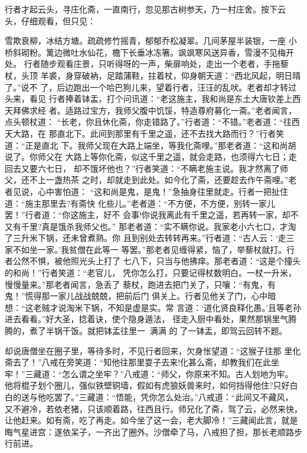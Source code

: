 行者才起云头，寻庄化斋，一直南行，忽见那古树参天，乃一村庄舍。按下云
头，仔细观看，但只见：

雪欺衰柳，冰结方塘。疏疏修竹摇青，郁郁乔松凝翠。几间茅屋半装银，一座
小桥斜砌粉。篱边微吐水仙花，檐下长垂冰冻箸。飒飒寒风送异香，雪漫不见梅开
处。
行者随步观看庄景，只听得呀的一声，柴扉响处，走出一个老者，手拖藜杖，头顶
羊裘，身穿破衲，足踏蒲鞋，拄着杖，仰身朝天道：“西北风起，明日晴了。”说不
了，后边跑出一个哈巴狗儿来，望着行者，汪汪的乱吠。老者却才转过头来，看见
行者捧着钵盂，打个问讯道：“老这施主，我和尚是东土大唐钦差上西天拜佛求经
者。适路过宝方，我师父腹中饥馁，特造尊府募化一斋。”老者闻言，点头顿杖道：
“长老，你且休化斋，你走错路了。”行者道：“不错。”老者道：“往西天大路，在
那直北下。此间到那里有千里之遥，还不去找大路而行？”行者笑道：“正是直北
下。我师父现在大路上端坐，等我化斋哩。”那老者道：“这和尚胡说了。你师父在
大路上等你化斋，似这千里之遥，就会走路，也须得六七日；走回去又要六七日，
却不饿坏他也？”行者笑道：“不瞒老施主说。我才然离了师父，还不上一盏热茶
之时，却就走到此处。如今化了斋，还要趁去作午斋哩。”老者见说，心中害怕道：
“这和尚是鬼，是鬼！”急抽身往里就走。行者一把扯住道：“施主那里去?有斋快
化些儿。”老者道：“不方便，不方便，别转一家儿罢！”行者道：“你这施主，好不
会事!你说我离此有千里之遥，若再转一家，却不又有千里?真是饿杀我师父也。”
那老者道：“实不瞒你说。我家老小六七口，才淘了三升米下锅，还未曾煮熟。你
且到别处去转转再来。”行者道：“古人云：‘走三家不如坐一家。’我贫僧在此等一
等罢。”那老者见缠得紧，恼了，举藜杖就打。行者公然不惧，被他照光头上打了
七八下，只当与他拂痒。那老者道：“这是个撞头的和尚！”行者笑道：“老官儿，
凭你怎么打，只要记得杖数明白。一杖一升米，慢慢量来。”那老者闻言，急丢了
藜杖，跑进去把门关了，只嚷：“有鬼，有鬼！”慌得那一家儿战战兢兢，把前后门
俱关上。行者见他关了门，心中暗想：“这老贼才说淘米下锅，不知是虚是实。常
言道：‘道化贤良释化愚。’且等老孙进去看看。”好大圣，捻着诀，使个隐身遁法，
径走入厨中看处，果然那锅里气腾腾的，煮了半锅干饭。就把钵盂往里一，满满
的了一钵盂，即驾云回转不题。

却说唐僧坐在圈子里，等待多时，不见行者回来，欠身怅望道：“这猴子往那
里化斋去了！”八戒在旁笑道：“知他往那里耍子去来!化甚么斋，却教我们在此坐
牢！”三藏道：“怎么谓之坐牢？”八戒道：“师父，你原来不知。古人划地为牢。
他将棍子划个圈儿，强似铁壁铜墙，假如有虎狼妖兽来时，如何挡得他住?只好白
白的送与他吃罢了。”三藏道：“悟能，凭你怎么处治。”八戒道：“此间又不藏风，
又不避冷，若依老猪，只该顺着路，往西且行。师兄化了斋，驾了云，必然来快，
让他赶来。如有斋，吃了再走。如今坐了这一会，老大脚冷！”三藏闻此言，就是
晦气星进宫：遂依呆子，一齐出了圈外。沙僧牵了马，八戒担了担，那长老顺路步
行前进。

